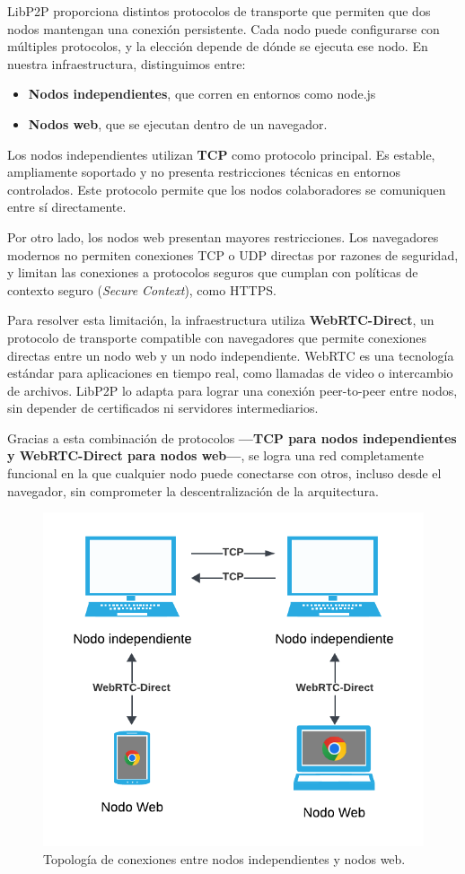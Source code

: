 LibP2P proporciona distintos protocolos de transporte que permiten que dos nodos mantengan una conexión persistente. Cada nodo puede configurarse con múltiples protocolos, y la elección depende de dónde se ejecuta ese nodo. En nuestra infraestructura, distinguimos entre:

\begin{itemize}
    \item \textbf{Nodos independientes}, que corren en entornos como node.js
    \item \textbf{Nodos web}, que se ejecutan dentro de un navegador.
\end{itemize}

Los nodos independientes utilizan \textbf{TCP} como protocolo principal. Es estable, ampliamente soportado y no presenta restricciones técnicas en entornos controlados. Este protocolo permite que los nodos colaboradores se comuniquen entre sí directamente.

Por otro lado, los nodos web presentan mayores restricciones. Los navegadores modernos no permiten conexiones TCP o UDP directas por razones de seguridad, y limitan las conexiones a protocolos seguros que cumplan con políticas de contexto seguro (\textit{Secure Context}), como HTTPS.

Para resolver esta limitación, la infraestructura utiliza \textbf{WebRTC-Direct}, un protocolo de transporte compatible con navegadores que permite conexiones directas entre un nodo web y un nodo independiente. WebRTC es una tecnología estándar para aplicaciones en tiempo real, como llamadas de video o intercambio de archivos. LibP2P lo adapta para lograr una conexión peer-to-peer entre nodos, sin depender de certificados ni servidores intermediarios.

Gracias a esta combinación de protocolos \textbf{—TCP para nodos independientes y WebRTC-Direct para nodos web—}, se logra una red completamente funcional en la que cualquier nodo puede conectarse con otros, incluso desde el navegador, sin comprometer la descentralización de la arquitectura.

\begin{figure}[H]
\centering
\includegraphics[width=0.55\linewidth]{img/solucion-ipfs/topologia.png}
\caption{Topología de conexiones entre nodos independientes y nodos web.}
\label{fig:topologia-conexiones}
\end{figure}

